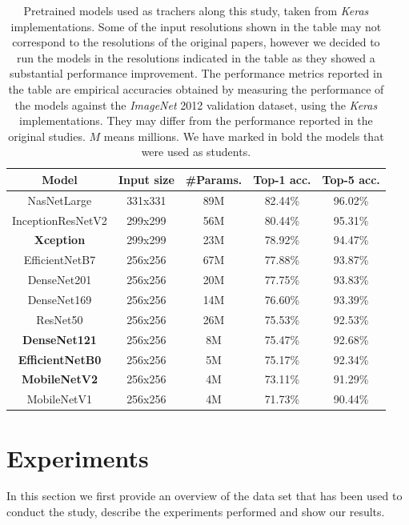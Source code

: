 \documentclass{elsarticle}
\begin{document}
	
	\begin{table}[h]
		\small
		\caption{Pretrained models used as trachers along this study, taken from \textit{Keras} implementations. Some of the input resolutions shown in the table may not correspond to the resolutions of the original papers, however we decided to run the models in the resolutions indicated in the table as they showed a substantial performance improvement. The performance metrics reported in the table are empirical accuracies obtained by measuring the performance of the models against the \textit{ImageNet} 2012 validation dataset, using the \textit{Keras} implementations. They may differ from the performance reported in the original studies. $M$ means millions. We have marked in bold the models that were used as students.}
		\centering
	\begin{tabular}{c|cc|cc}
		\toprule
		         Model          & Input size & \#Params. & Top-1 acc. & Top-5 acc. \\ \midrule
		      NasNetLarge       &  331x331   &    89M    &  82.44\%   &  96.02\%   \\
		   InceptionResNetV2    &  299x299   &    56M    &  80.44\%   &  95.31\%   \\
		   \textbf{Xception}    &  299x299   &    23M    &  78.92\%   &  94.47\%   \\
		    EfficientNetB7      &  256x256   &    67M    &  77.88\%   &  93.87\%   \\
		      DenseNet201       &  256x256   &    20M    &  77.75\%   &  93.83\%   \\
		      DenseNet169       &  256x256   &    14M    &  76.60\%   &  93.39\%   \\
		       ResNet50         &  256x256   &    26M    &  75.53\%   &  92.53\%   \\
		 \textbf{DenseNet121}   &  256x256   &    8M     &  75.47\%   &  92.68\%   \\
		\textbf{EfficientNetB0} &  256x256   &    5M     &  75.17\%   &  92.34\%   \\
		 \textbf{MobileNetV2}   &  256x256   &    4M     &  73.11\%   &  91.29\%   \\
		      MobileNetV1       &  256x256   &    4M     &  71.73\%   &  90.44\%   \\ \bottomrule
	\end{tabular}
	\label{table:models}
	\end{table}
	
	\section{Experiments} \label{sec:experiments}
	In this section we first provide an overview of the data set that has been used to conduct the study, describe the experiments performed and show our results.
	
\end{document}
